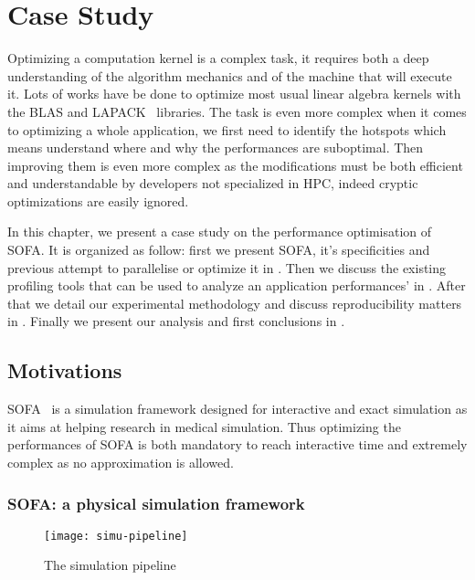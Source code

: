 \chapter{Case Study}
\label{chap:perf}

Optimizing a computation kernel is a complex task, it requires both a deep
understanding of the algorithm mechanics and of the machine that will execute
it. Lots of works have be done to optimize most usual linear algebra kernels
with the \gls{BLAS} and \gls{LAPACK}~\cite{Dongarra92LAPACK} libraries. The
task is even more complex when it comes to optimizing a whole application, we
first need to identify the hotspots which means understand where and why the
performances are suboptimal. Then improving them is even more complex as the
modifications must be both efficient and understandable by developers not
specialized in \gls{HPC}, indeed cryptic optimizations are easily ignored.

In this chapter, we present a case study on the performance optimisation of
\gls{SOFA}. It is organized as follow: first we present \gls{SOFA}, it's
specificities and previous attempt to parallelise or optimize it in
. Then we discuss the existing profiling tools that can be
used to analyze an application performances' in .  After that
we detail our experimental methodology and discuss reproducibility matters in
. Finally we present our analysis and first conclusions in
.

\section{Motivations}
\label{sec:motivations}


\gls{SOFA}~\cite{Allard07SOFA} is a simulation framework designed for
interactive and exact simulation as it aims at helping research in medical
simulation. Thus optimizing the performances of \gls{SOFA} is both mandatory
to reach interactive time and extremely complex as no approximation is
allowed.

\subsection{SOFA: a physical simulation framework}

\begin{figure}[htb]
    \centering
    \texttt{[image: simu-pipeline]}
    \caption[The simulation pipeline]{The simulation pipeline}
    \label{fig:simu-pipeline}
\end{figure}


